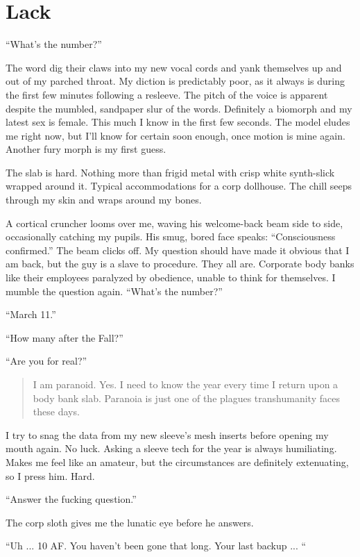 \chapter{Lack}
\label{chap:lack}

``What's the number?''

The word dig their claws into my new vocal cords and yank themselves
up and out of my parched throat.  My diction is predictably poor, as
it always is during the first few minutes following a resleeve. The
pitch of the voice is apparent despite the mumbled, sandpaper slur of
the words. Definitely a biomorph and my latest sex is female. This
much I know in the first few seconds. The model eludes me right now,
but I'll know for certain soon enough, once motion is mine
again. Another fury morph is my first guess.

The slab is hard. Nothing more than frigid metal with crisp white
synth-slick wrapped around it. Typical accommodations for a corp
dollhouse. The chill seeps through my skin and wraps around my bones.

A cortical cruncher looms over me, waving his welcome-back beam side
to side, occasionally catching my pupils. His smug, bored face speaks:
``Consciousness confirmed.'' The beam clicks off. My question should
have made it obvious that I am back, but the guy is a slave to
procedure. They all are. Corporate body banks like their employees
paralyzed by obedience, unable to think for themselves. I mumble the
question again. ``What's the number?''

``March 11.''

``How many after the Fall?''

``Are you for real?''

\begin{quotation}
  I am paranoid. Yes. I need to know the year every time I return upon
  a body bank slab. Paranoia is just one of the plagues transhumanity
  faces these days.
\end{quotation}

I try to snag the data from my new sleeve's mesh inserts before
opening my mouth again. No luck. Asking a sleeve tech for the year is
always humiliating. Makes me feel like an amateur, but the
circumstances are definitely extenuating, so I press him. Hard.

``Answer the fucking question.''

The corp sloth gives me the lunatic eye before he answers.

``Uh ... 10 AF. You haven't been gone that long. Your last backup ... ``

